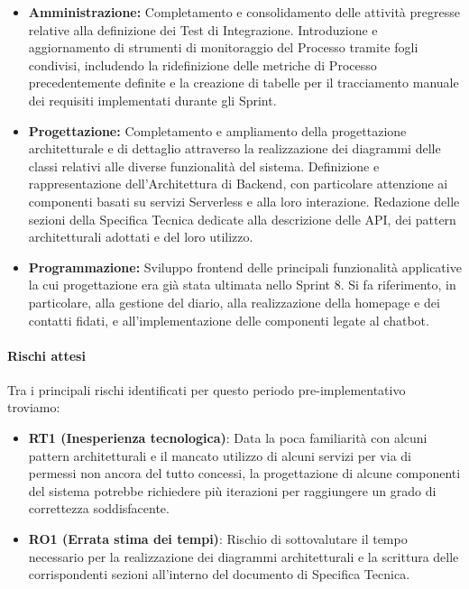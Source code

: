 \documentclass[a4paper,12pt]{article}
\begin{document}
\begin{itemize}
\item \textbf{Amministrazione:} Completamento e consolidamento delle attività pregresse relative alla definizione dei Test di Integrazione. Introduzione e aggiornamento di strumenti di monitoraggio del Processo tramite fogli condivisi, includendo la ridefinizione delle metriche di Processo precedentemente definite e la creazione di tabelle per il tracciamento manuale dei requisiti implementati durante gli Sprint.

\item \textbf{Progettazione:} Completamento e ampliamento della progettazione architetturale e di dettaglio attraverso la realizzazione dei diagrammi delle classi relativi alle diverse funzionalità del sistema. Definizione e rappresentazione dell’Architettura di Backend, con particolare attenzione ai componenti basati su servizi Serverless e alla loro interazione. Redazione delle sezioni della Specifica Tecnica dedicate alla descrizione delle API, dei pattern architetturali adottati e del loro utilizzo.

\item \textbf{Programmazione:} Sviluppo frontend delle principali funzionalità applicative la cui progettazione era già stata ultimata nello Sprint 8. Si fa riferimento, in particolare, alla gestione del diario, alla realizzazione della homepage e dei contatti fidati, e all’implementazione delle componenti legate al chatbot.
\end{itemize}

\paragraph{Rischi attesi}
Tra i principali rischi identificati per questo periodo pre-implementativo troviamo:
\begin{itemize}
    \item \textbf{RT1 (Inesperienza tecnologica)}: Data la poca familiarità con alcuni pattern architetturali e il mancato utilizzo di alcuni servizi per via di permessi non ancora del tutto concessi, la progettazione di alcune componenti del sistema potrebbe richiedere più iterazioni per raggiungere un grado di correttezza soddisfacente.
    \item \textbf{RO1 (Errata stima dei tempi)}: Rischio di sottovalutare il tempo necessario per la realizzazione dei diagrammi architetturali e la scrittura delle corrispondenti sezioni all'interno del documento di Specifica Tecnica.
\end{itemize}
\end{document}
